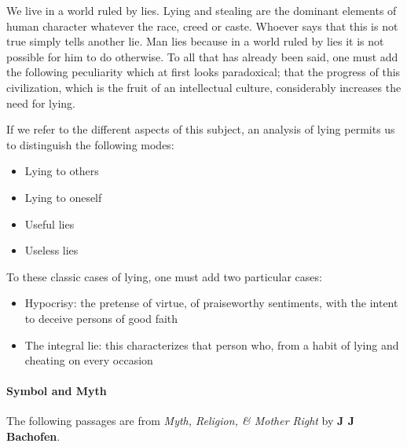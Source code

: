 \begin{quotex}
We live in a world ruled by lies. Lying and stealing are the dominant elements of human character whatever the race, creed or caste. Whoever says that this is not true simply tells another lie. Man lies because in a world ruled by lies it is not possible for him to do otherwise. To all that has already been said, one must add the following peculiarity which at first looks paradoxical; that the progress of this civilization, which is the fruit of an intellectual culture, considerably increases the need for lying.

If we refer to the different aspects of this subject, an analysis of lying permits us to distinguish the following modes:

\end{quotex}
\begin{itemize}
\item \begin{quotex}
Lying to others 
\end{quotex}
\item \begin{quotex}
Lying to oneself 
\end{quotex}
\item \begin{quotex}
Useful lies 
\end{quotex}
\item \begin{quotex}
Useless lies 
\end{quotex}
\end{itemize}
\begin{quotex}
To these classic cases of lying, one must add two particular cases:

\end{quotex}
\begin{itemize}
\item \begin{quotex}
Hypocrisy: the pretense of virtue, of praiseworthy sentiments, with the intent to deceive persons of good faith 
\end{quotex}
\item \begin{quotex}
The integral lie: this characterizes that person who, from a habit of lying and cheating on every occasion 
\end{quotex}
\end{itemize}
\paragraph{Symbol and Myth}
The following passages are from \emph{Myth, Religion, \& Mother Right} by \textbf{J J Bachofen}.

